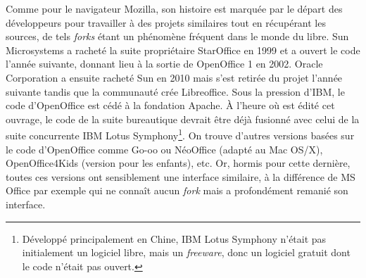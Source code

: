 \documentclass{FramateX}
\begin{document}
\begin{refsection}
Comme pour le navigateur Mozilla, son histoire est marquée par le départ
des développeurs pour travailler à des projets similaires tout en
récupérant les sources, de tels \textit{forks} étant un phénomène
fréquent dans le monde du libre. Sun Microsystems a racheté la suite
propriétaire StarOffice en 1999 et a ouvert le code l'année suivante,
donnant lieu à la sortie de OpenOffice 1 en 2002. Oracle Corporation a
ensuite racheté Sun en 2010 mais s'est retirée du projet l'année
suivante tandis que la communauté crée Libreoffice. Sous la pression
d'IBM, le code d'OpenOffice est cédé à la fondation Apache. À l'heure
où est édité cet ouvrage, le code de la suite bureautique devrait être
déjà fusionné avec celui de la suite concurrente IBM Lotus Symphony\footnote{Développé principalement en Chine, IBM
Lotus Symphony n'était pas initialement un logiciel libre, mais un
\textit{freeware}, donc un logiciel gratuit dont le code n'était pas
ouvert.}. On trouve d'autres versions basées sur le code d'OpenOffice
comme Go-oo ou NéoOffice (adapté au Mac OS/X), OpenOffice4Kids (version
pour les enfants), etc. Or, hormis pour cette dernière, toutes ces
versions ont sensiblement une interface similaire, à la différence de
MS Office par exemple qui ne connaît aucun \textit{fork} mais a
profondément remanié son interface. 


\end{refsection}
\end{document}
